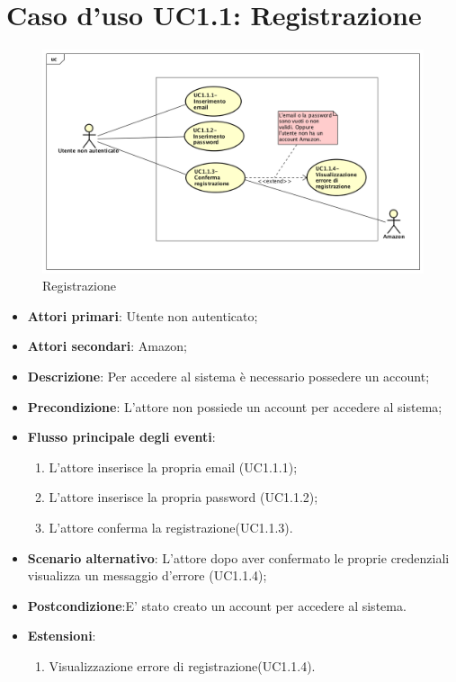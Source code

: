 \section{Caso d'uso UC1.1: Registrazione}
\begin{figure} [h]
	\centering
	\includegraphics[scale=0.4]{./Diagram/UC1-1.png}
	\caption{Registrazione}\label{}
\end{figure}
\begin{itemize}
	\item \textbf{Attori primari}: Utente non autenticato;
	\item \textbf{Attori secondari}: Amazon;
	\item \textbf{Descrizione}: Per accedere al sistema è necessario possedere un account;
	\item \textbf{Precondizione}: L'attore non possiede un account per accedere al sistema;
	\item \textbf{Flusso principale degli eventi}: 
	\begin{enumerate}
		\item L'attore inserisce la propria email (UC1.1.1);
		\item L'attore inserisce la propria password (UC1.1.2);
		\item L'attore conferma la registrazione(UC1.1.3).
	\end{enumerate}
	\item \textbf{Scenario alternativo}: L'attore dopo aver confermato le proprie credenziali visualizza un messaggio d'errore (UC1.1.4);
	\item \textbf{Postcondizione}:E' stato creato un account per accedere al sistema.
		\item \textbf{Estensioni}:
	\begin{enumerate}
		\item	Visualizzazione errore di registrazione(UC1.1.4).
	\end{enumerate}
\end{itemize}

